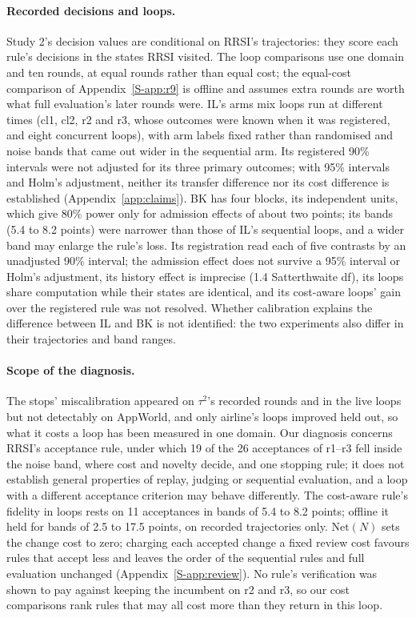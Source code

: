 \documentclass[11pt]{article}
\begin{document}
\paragraph{Recorded decisions and loops.} Study 2's decision values are conditional on RRSI's trajectories: they score each rule's decisions in the states RRSI visited. The loop comparisons use one domain and ten rounds, at equal rounds rather than equal cost; the equal-cost comparison of Appendix~\ref*{S-app:r9} is offline and assumes extra rounds are worth what full evaluation's later rounds were. IL's arms mix loops run at different times (cl1, cl2, r2 and r3, whose outcomes were known when it was registered, and eight concurrent loops), with arm labels fixed rather than randomised and noise bands that came out wider in the sequential arm. Its registered 90\% intervals were not adjusted for its three primary outcomes; with 95\% intervals and Holm's adjustment, neither its transfer difference nor its cost difference is established (Appendix~\ref{app:claims}). BK has four blocks, its independent units, which give 80\% power only for admission effects of about two points; its bands (5.4 to 8.2 points) were narrower than those of IL's sequential loops, and a wider band may enlarge the rule's loss. Its registration read each of five contrasts by an unadjusted 90\% interval; the admission effect does not survive a 95\% interval or Holm's adjustment, its history effect is imprecise (1.4 Satterthwaite df), its loops share computation while their states are identical, and its cost-aware loops' gain over the registered rule was not resolved. Whether calibration explains the difference between IL and BK is not identified: the two experiments also differ in their trajectories and band ranges.

\paragraph{Scope of the diagnosis.} The stops' miscalibration appeared on $\tau^2$'s recorded rounds and in the live loops but not detectably on AppWorld, and only airline's loops improved held out, so what it costs a loop has been measured in one domain. Our diagnosis concerns RRSI's acceptance rule, under which 19 of the 26 acceptances of r1--r3 fell inside the noise band, where cost and novelty decide, and one stopping rule; it does not establish general properties of replay, judging or sequential evaluation, and a loop with a different acceptance criterion may behave differently. The cost-aware rule's fidelity in loops rests on 11 acceptances in bands of 5.4 to 8.2 points; offline it held for bands of 2.5 to 17.5 points, on recorded trajectories only. $\mathrm{Net}(N)$ sets the change cost to zero; charging each accepted change a fixed review cost favours rules that accept less and leaves the order of the sequential rules and full evaluation unchanged (Appendix~\ref*{S-app:review}). No rule's verification was shown to pay against keeping the incumbent on r2 and r3, so our cost comparisons rank rules that may all cost more than they return in this loop.
\end{document}
